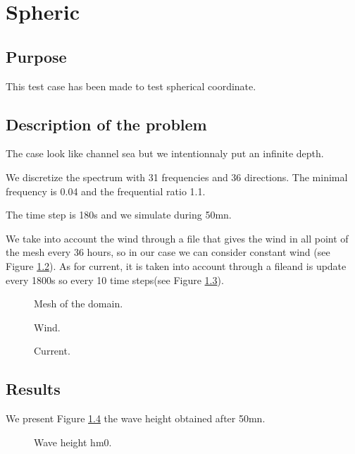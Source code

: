 \chapter{Spheric}
%
%
\section{Purpose}
%
This test case has been made to test spherical coordinate. 

\section{Description of the problem}

The case look like channel sea but we intentionnaly put an infinite depth. 

We discretize the spectrum with 31 frequencies and 36 directions. The minimal
frequency is 0.04 and the frequential ratio 1.1.

The time step is 180s and we simulate during 50mn. 

We take into account the wind through a file that gives the wind in all point
of the mesh every 36 hours, so in our case we can consider constant wind (see
Figure \ref{figSphericVent}). As for current, it is taken into account through
a fileand is update every 1800s so every 10 time steps(see Figure
\ref{figSphericCourrant}).

\begin{figure} [!h]
\centering
{}
 \caption{Mesh of the domain.}
\label{meshSpheric}
\end{figure}

\begin{figure} [!h]
\centering
{}
 \caption{Wind.}
\label{figSphericVent}
\end{figure}
\begin{figure} [!h]
\centering
{}
 \caption{Current.}
\label{figSphericCourrant}
\end{figure}

\section{Results}
We present Figure \ref{figSphericHm0} the wave height obtained after 50mn. 
\begin{figure} [!h]
\centering
{}
 \caption{Wave height hm0.}
\label{figSphericHm0}
\end{figure}
